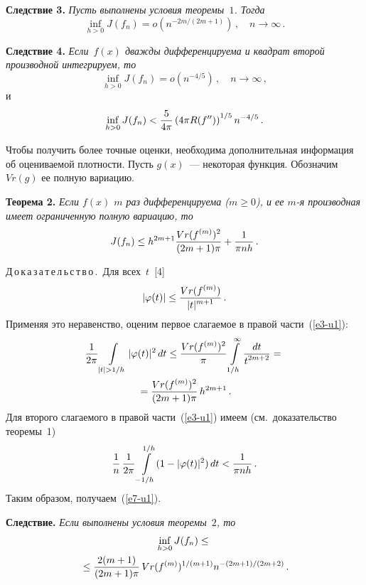 \begin{multicols}{2}
\smallskip

\noindent
\textbf{Следствие 3.} \textit{Пусть выполнены условия теоремы~$1$. Тогда}
$$
\inf\limits_{h>0}J(f_n)=o\left(n^{-2m/(2m+1)}\right)\,,\quad n\to\infty\,.
$$

\smallskip

\noindent
\textbf{Следствие 4.} \textit{Если~$f(x)$ дважды дифференцируема и квадрат
второй производной интегрируем, то}
$$
\inf\limits_{h>0}J(f_n)=o(n^{-4/5})\,,\quad  n\to\infty\,,
$$
и
$$
\inf\limits_{h>0}J(f_n)<\displaystyle\frac{\displaystyle 5\mathstrut}{\displaystyle 4\pi\mathstrut}\left(4\pi R(f'')\right)^{1/5}n^{-4/5}\,.
$$

\smallskip

Чтобы получить более точные оценки, необходима дополнительная информация
об оцениваемой плотности. Пусть $g(x)$~--- некоторая функция. Обозначим~$Vr(g)$ 
ее полную вариацию.

\medskip

\noindent
\textbf{Теорема 2.} \textit{Если $f(x)$ $m$ раз дифференцируема ($m\ge0$),
и ее $m$-я производная имеет ограниченную полную вариацию, то}
\begin{equation}
J(f_n)\le h^{2m+1}\displaystyle\frac{\displaystyle Vr(f^{(m)})^2\mathstrut}{\displaystyle (2m+1)\pi\mathstrut}+\displaystyle\frac{\displaystyle 1\mathstrut}{\displaystyle \pi nh\mathstrut}\,.
\label{e7-u1}
\end{equation}

\medskip

\noindent
Д\,о\,к\,а\,з\,а\,т\,е\,л\,ь\,с\,т\,в\,о\,.\ Для всех~$t$~[4]
$$
\left\vert\varphi(t)\right\vert\le \displaystyle\frac{\displaystyle Vr(f^{(m)})\mathstrut}{\displaystyle |t|^{m+1}\mathstrut}\,.
$$
Применяя это неравенство, оценим первое слагаемое в правой части~(\ref{e3-u1}):
\begin{multline*}
\fr{1}{2\pi}\int\limits_{|t|>1/h}|\varphi(t)|^2\,dt\le
\fr{Vr(f^{(m)})^2}{\pi}\int\limits_{1/h}^\infty \fr{dt}{t^{2m+2}}
={}\\
{}= \fr{Vr(f^{(m)})^2}{(2m+1)\pi}\,h^{2m+1}\,.
\end{multline*}
Для второго слагаемого в правой части~(\ref{e3-u1})
имеем (см.\ доказательство теоремы~1)
$$
\displaystyle\frac{\displaystyle 1\mathstrut}{\displaystyle n\mathstrut}\,\displaystyle\frac{\displaystyle 1\mathstrut}{\displaystyle 2\pi\mathstrut}\int\limits_{-1/h}^{1/h}(1-|\varphi(t)|^2)\,dt<
\displaystyle\frac{\displaystyle 1\mathstrut}{\displaystyle \pi nh\mathstrut}\,.
$$
Таким образом, получаем~(\ref{e7-u1}).

\smallskip

\noindent
\textbf{Следствие.} \textit{Если выполнены условия теоремы~$2$, то}
\begin{multline*}
\inf\limits_{h>0}J(f_n)\le{}\\
{}\le \displaystyle\frac{\displaystyle 2(m+1)\mathstrut}{\displaystyle (2m+1)\pi\mathstrut}\,Vr(f^{(m)})^{1/(m+1)}n^{-(2m+1)/(2m+2)}\,.
\end{multline*}


\end{multicols}

